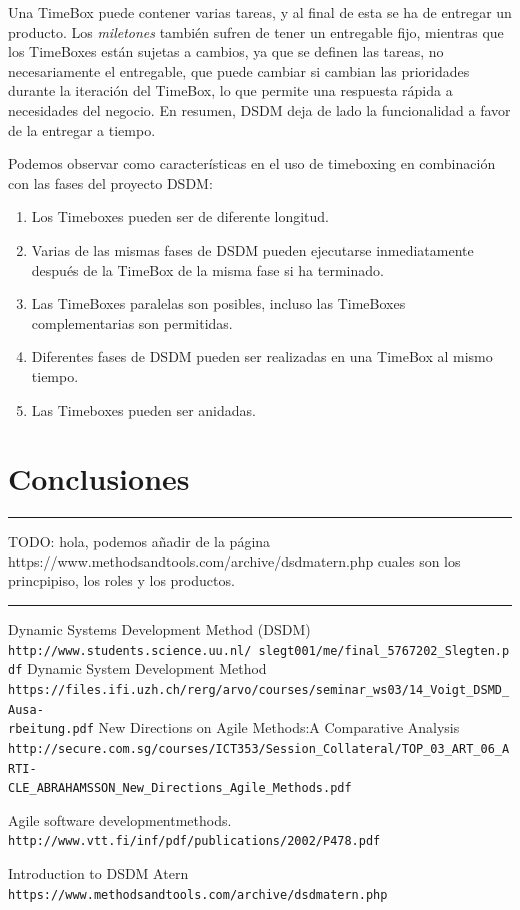 \documentclass[12pt,a4paper]{article}
\begin{document}
 Una TimeBox puede contener varias tareas, y al final de esta se ha de entregar un producto. Los \emph{miletones} también
sufren de tener un entregable fijo, mientras que los TimeBoxes están sujetas a cambios, ya que se definen las tareas, no necesariamente el entregable, que puede cambiar si cambian las prioridades durante la iteración del TimeBox, lo que permite una respuesta rápida a necesidades del negocio. En resumen, DSDM deja de lado la funcionalidad a favor de la entregar a tiempo. 

Podemos observar como características en el uso de timeboxing en combinación con las fases del proyecto DSDM:
\begin{enumerate}
	\item  Los Timeboxes pueden ser de diferente longitud.
	\item  Varias de las mismas fases de DSDM pueden ejecutarse inmediatamente después de la TimeBox de la misma fase si ha terminado.
\item Las TimeBoxes paralelas son posibles, incluso las TimeBoxes complementarias son permitidas.
\item Diferentes fases de DSDM pueden ser realizadas en una TimeBox al mismo tiempo.
\item Las Timeboxes pueden ser anidadas.
\end{enumerate}



\section{Conclusiones}

{\color{red} \rule{\linewidth}{0.5mm} }
{\color{blue} TODO: hola, podemos añadir de la página https://www.methodsandtools.com/archive/dsdmatern.php cuales son los princpipiso, los roles y los productos.}\\
{\color{red} \rule{\linewidth}{0.5mm} }

\begin{thebibliography}{9}

 Dynamic Systems Development Method (DSDM)
\\\texttt{http://www.students.science.uu.nl/~slegt001/me/final\_5767202\_Slegten.pdf}
Dynamic System Development Method
\\\texttt{https://files.ifi.uzh.ch/rerg/arvo/courses/seminar\_ws03/14\_Voigt\_DSMD\_Ausa-\\rbeitung.pdf}
New Directions on Agile Methods:A Comparative Analysis
\\\texttt{http://secure.com.sg/courses/ICT353/Session\_Collateral/TOP\_03\_ART\_06\_ARTI-\\CLE\_ABRAHAMSSON\_New\_Directions\_Agile\_Methods.pdf}

Agile software developmentmethods.
\\\texttt{http://www.vtt.fi/inf/pdf/publications/2002/P478.pdf}


Introduction to DSDM Atern
\\\texttt{https://www.methodsandtools.com/archive/dsdmatern.php}
\end{thebibliography}
\end{document}
